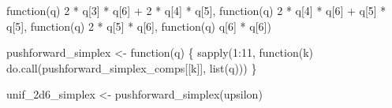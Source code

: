 \documentclass[
  letterpaper,
  DIV=11,
  numbers=noendperiod]{scrartcl}
\newenvironment{Shaded}{\begin{snugshade}}{\end{snugshade}}
\newcommand{\ControlFlowTok}[1]{\textcolor[rgb]{0.00,0.23,0.31}{#1}}
\newcommand{\DecValTok}[1]{\textcolor[rgb]{0.68,0.00,0.00}{#1}}
\newcommand{\FunctionTok}[1]{\textcolor[rgb]{0.28,0.35,0.67}{#1}}
\newcommand{\NormalTok}[1]{\textcolor[rgb]{0.00,0.23,0.31}{#1}}
\newcommand{\OtherTok}[1]{\textcolor[rgb]{0.00,0.23,0.31}{#1}}
\newcommand{\SpecialCharTok}[1]{\textcolor[rgb]{0.37,0.37,0.37}{#1}}
\begin{document}
\begin{Shaded}
\begin{Highlighting}[]
    \ControlFlowTok{function}\NormalTok{(q)}
     \DecValTok{2} \SpecialCharTok{*}\NormalTok{ q[}\DecValTok{3}\NormalTok{] }\SpecialCharTok{*}\NormalTok{ q[}\DecValTok{6}\NormalTok{] }\SpecialCharTok{+} \DecValTok{2} \SpecialCharTok{*}\NormalTok{ q[}\DecValTok{4}\NormalTok{] }\SpecialCharTok{*}\NormalTok{ q[}\DecValTok{5}\NormalTok{],}
    \ControlFlowTok{function}\NormalTok{(q)}
     \DecValTok{2} \SpecialCharTok{*}\NormalTok{ q[}\DecValTok{4}\NormalTok{] }\SpecialCharTok{*}\NormalTok{ q[}\DecValTok{6}\NormalTok{] }\SpecialCharTok{+}\NormalTok{     q[}\DecValTok{5}\NormalTok{] }\SpecialCharTok{*}\NormalTok{ q[}\DecValTok{5}\NormalTok{],}
    \ControlFlowTok{function}\NormalTok{(q)}
     \DecValTok{2} \SpecialCharTok{*}\NormalTok{ q[}\DecValTok{5}\NormalTok{] }\SpecialCharTok{*}\NormalTok{ q[}\DecValTok{6}\NormalTok{],}
    \ControlFlowTok{function}\NormalTok{(q)}
\NormalTok{         q[}\DecValTok{6}\NormalTok{] }\SpecialCharTok{*}\NormalTok{ q[}\DecValTok{6}\NormalTok{])}

\NormalTok{pushforward\_simplex }\OtherTok{\textless{}{-}} \ControlFlowTok{function}\NormalTok{(q) \{}
  \FunctionTok{sapply}\NormalTok{(}\DecValTok{1}\SpecialCharTok{:}\DecValTok{11}\NormalTok{,}
         \ControlFlowTok{function}\NormalTok{(k) }\FunctionTok{do.call}\NormalTok{(pushforward\_simplex\_comps[[k]], }\FunctionTok{list}\NormalTok{(q)))}
\NormalTok{\}}
\end{Highlighting}
\end{Shaded}

\begin{Shaded}
\begin{Highlighting}[]
\NormalTok{unif\_2d6\_simplex }\OtherTok{\textless{}{-}} \FunctionTok{pushforward\_simplex}\NormalTok{(upsilon)}
\end{Highlighting}
\end{Shaded}
\end{document}
